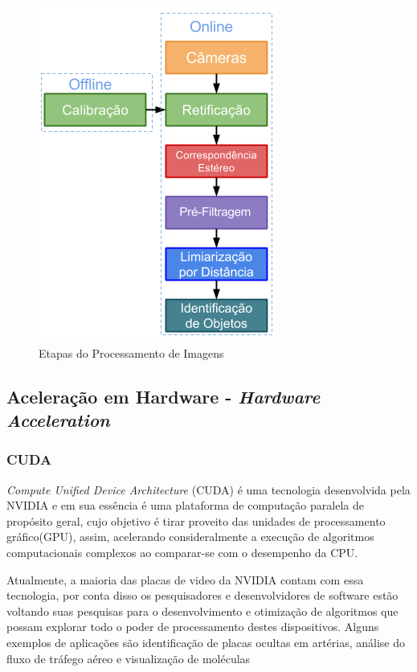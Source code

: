\begin{figure}[H]
	\centering
	\includegraphics[scale=0.50]{./Resources/stereo_processor_steps2.png}
	\caption{Etapas do Processamento de Imagens}
	\label{stereo_processor_steps}
\end{figure}


\subsection{Aceleração em Hardware - \textit{Hardware Acceleration}}
\subsubsection{CUDA}

\textit{Compute Unified Device Architecture} (CUDA) é uma tecnologia desenvolvida pela NVIDIA e em sua essência é uma plataforma de computação paralela de propósito geral, cujo objetivo é tirar proveito das unidades de processamento gráfico(GPU), assim, acelerando consideralmente a execução de algoritmos computacionais complexos ao comparar-se com o desempenho da CPU.

Atualmente, a maioria das placas de video da NVIDIA contam com essa tecnologia, por conta disso os pesquisadores e desenvolvidores de software estão voltando suas pesquisas para o desenvolvimento e otimização de algoritmos que possam explorar todo o poder de processamento destes dispositivos. Alguns exemplos de aplicações são identificação de placas ocultas em artérias, análise do fluxo de tráfego aéreo e visualização de moléculas

